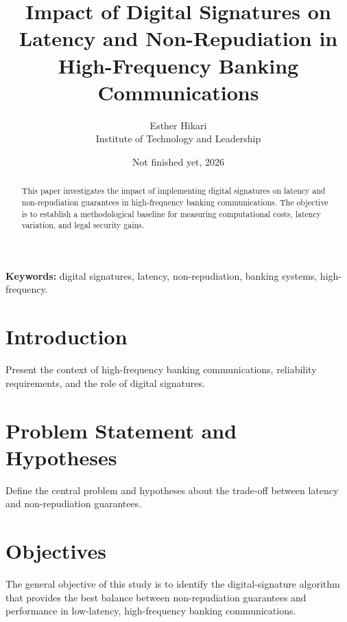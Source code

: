 \documentclass[12pt]{article}
\title{Impact of Digital Signatures on Latency and Non-Repudiation in High-Frequency Banking Communications}
\author{Esther Hikari \\ Institute of Technology and Leadership}
\date{Not finished yet, 2026}
\begin{document}
\maketitle

\begin{abstract}
This paper investigates the impact of implementing digital signatures on latency and non-repudiation guarantees in high-frequency banking communications. The objective is to establish a methodological baseline for measuring computational costs, latency variation, and legal security gains.
\end{abstract}

\textbf{Keywords:} digital signatures, latency, non-repudiation, banking systems, high-frequency.

\section{Introduction}
Present the context of high-frequency banking communications, reliability requirements, and the role of digital signatures.

\section{Problem Statement and Hypotheses}
Define the central problem and hypotheses about the trade-off between latency and non-repudiation guarantees.

\section{Objectives}
The general objective of this study is to identify the digital-signature algorithm that provides the best balance between non-repudiation guarantees and performance in low-latency, high-frequency banking communications.
\end{document}
